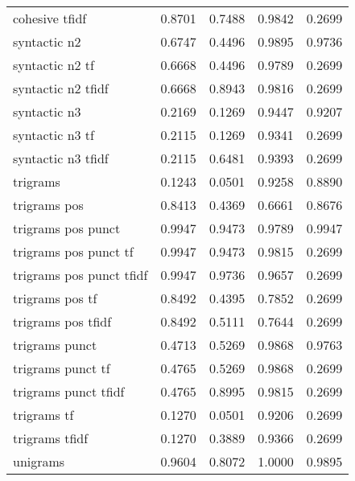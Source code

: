\documentclass{article}
\begin{document}
\begin{table}
\begin{tabular}{lrrrr}
cohesive tfidf             & 0.8701 &       0.7488 &         0.9842 &               0.2699 \\
syntactic n2               & 0.6747 &       0.4496 &         0.9895 &               0.9736 \\
syntactic n2 tf            & 0.6668 &       0.4496 &         0.9789 &               0.2699 \\
syntactic n2 tfidf         & 0.6668 &       0.8943 &         0.9816 &               0.2699 \\
syntactic n3               & 0.2169 &       0.1269 &         0.9447 &               0.9207 \\
syntactic n3 tf            & 0.2115 &       0.1269 &         0.9341 &               0.2699 \\
syntactic n3 tfidf         & 0.2115 &       0.6481 &         0.9393 &               0.2699 \\
trigrams                   & 0.1243 &       0.0501 &         0.9258 &               0.8890 \\
trigrams pos               & 0.8413 &       0.4369 &         0.6661 &               0.8676 \\
trigrams pos punct         & 0.9947 &       0.9473 &         0.9789 &               0.9947 \\
trigrams pos punct tf      & 0.9947 &       0.9473 &         0.9815 &               0.2699 \\
trigrams pos punct tfidf   & 0.9947 &       0.9736 &         0.9657 &               0.2699 \\
trigrams pos tf            & 0.8492 &       0.4395 &         0.7852 &               0.2699 \\
trigrams pos tfidf         & 0.8492 &       0.5111 &         0.7644 &               0.2699 \\
trigrams punct             & 0.4713 &       0.5269 &         0.9868 &               0.9763 \\
trigrams punct tf          & 0.4765 &       0.5269 &         0.9868 &               0.2699 \\
trigrams punct tfidf       & 0.4765 &       0.8995 &         0.9815 &               0.2699 \\
trigrams tf                & 0.1270 &       0.0501 &         0.9206 &               0.2699 \\
trigrams tfidf             & 0.1270 &       0.3889 &         0.9366 &               0.2699 \\
unigrams                   & 0.9604 &       0.8072 &         1.0000 &               0.9895 \\

\end{tabular}
\end{table}
\end{document}
